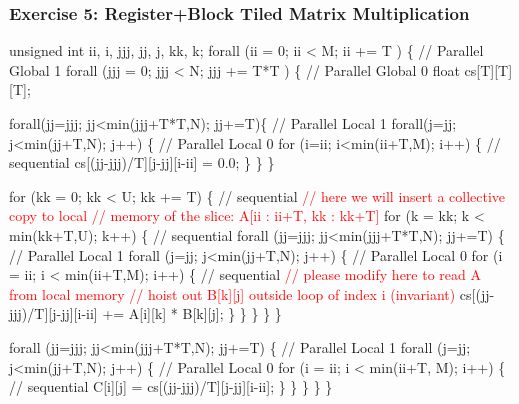 \documentclass{beamer}
\newcommand{\red}[1]{\textcolor{Red}{{#1}}}
\renewcommand{\emph}[1]{\textcolor{CosGreen}{ #1}}
\newcommand{\emp}[1]{\textcolor{DikuRed}{ #1}}
\begin{document}
\begin{frame}[fragile,t]
  \frametitle{Exercise 5: Register+Block Tiled Matrix Multiplication}

\begin{colorcode}[fontsize=\tiny]
unsigned int ii, i, jjj, jj, j, kk, k;
\emp{forall (ii = 0; ii < M; ii += T ) \{           // Parallel Global 1}
  \emp{forall (jjj = 0; jjj < N; jjj += T*T ) \{    // Parallel Global 0}
    float cs[T][T][T];

    \emph{forall(jj=jjj; jj<min(jjj+T*T,N); jj+=T)\{ // Parallel Local 1}
      \emph{forall(j=jj; j<min(jj+T,N); j++) \{      // Parallel Local 0}
        for (i=ii; i<min(ii+T,M); i++) \{      // sequential
          cs[(jj-jjj)/T][j-jj][i-ii] = 0.0;
    \} \} \}

    for (kk = 0; kk < U; kk += T) \{                 // sequential
      \red{// here we will insert a collective copy to local}
      \red{// memory of the slice: A[ii : ii+T, kk : kk+T]}
      for (k = kk; k < min(kk+T,U); k++) \{          // sequential
        \emph{forall (jj=jjj; jj<min(jjj+T*T,N); jj+=T) \{ // Parallel Local 1}
          \emph{forall (j=jj; j<min(jj+T,N); j++) \{       // Parallel Local 0}
            for (i = ii; i < min(ii+T,M); i++) \{    // sequential
              \red{// please modify here to read A from local memory}
              \red{// hoist out B[k][j] outside loop of index i (invariant)}
              cs[(jj-jjj)/T][j-jj][i-ii] += A[i][k] * B[k][j];
    \} \} \} \} \}

    \emp{forall (jj=jjj; jj<min(jjj+T*T,N); jj+=T) \{     // Parallel Local 1}
      \emp{forall (j=jj; j<min(jj+T,N); j++) \{           // Parallel Local 0}
        for (i = ii; i < min(ii+T, M); i++) \{       // sequential
          C[i][j] = cs[(jj-jjj)/T][j-jj][i-ii];
    \} \} \}
\} \}
\end{colorcode}
\end{frame}
\end{document}

